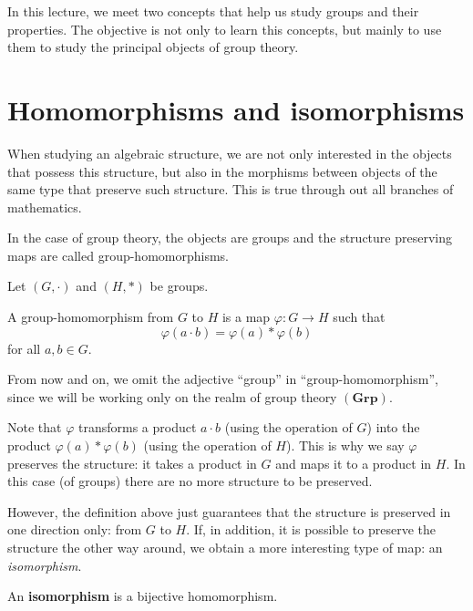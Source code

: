 \documentclass[11pt,a4paper]{article}
\begin{document}
\def\contador{Lesson 5}


In this lecture, we meet two concepts that help us study groups and their properties.
The objective is not only  to learn this concepts, but mainly to  use them to study the principal objects of group theory.

\section{Homomorphisms and isomorphisms}

When studying an algebraic structure, we are not only interested in the objects that possess this structure, but also in the morphisms between objects of the same type that preserve such structure. 
This is true through out all branches of mathematics.

In the case of group theory, the objects are groups and  the structure preserving maps are called group-homomorphisms.

Let \((G,\cdot)\) and \((H, *) \) be groups.

\begin{defi}
    A group-homomorphism from \(G\) to \(H\) is a map \(\varphi \colon G\to H\) such that 
    \[\varphi(a\cdot b) = \varphi(a) * \varphi(b)\]
    for all \(a,b\in G\).
\end{defi}

\begin{rem}
    From now and on, we omit the adjective ``group'' in ``group-homomorphism'', since we will be working only on the realm of group theory \((\mathbf{Grp})\).
\end{rem}

Note that \(\varphi\) transforms a product \(a\cdot b\) (using the operation of \(G\))  into the   product \(\varphi(a)*\varphi(b)\) (using the operation of \(H\)).
This is why we say \(\varphi\) preserves the structure: it takes a product in \(G\) and maps it to a product in \(H\).
In this case (of groups) there are no more structure to be preserved.

However, the definition above just guarantees that the structure is preserved   in one direction only: from \(G\) to \(H\).
If, in addition, it is possible to preserve 
the structure the other way around, we obtain a more interesting type of map: an \textit{isomorphism}.

\begin{defi}
    An \textbf{isomorphism} is a bijective homomorphism.
\end{defi}
\end{document}
